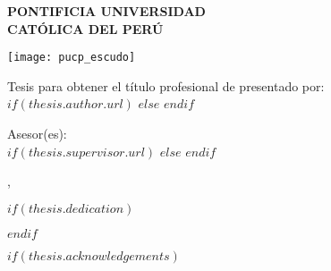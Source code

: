 \pagestyle{empty} %

\begin{titlepage}
\begin{center}

{\MakeUppercase{\textbf{PONTIFICIA UNIVERSIDAD \\ CATÓLICA DEL PERÚ}}\par}\vspace{0.25cm} %
\MakeUppercase{\textbf{\facname}}\vspace{0.5cm} %

\texttt{[image: pucp\_escudo]}\vspace{0.5cm}

{\ttitle\par}\vspace{0.4cm} %

{Tesis para obtener el título profesional de \degreename}{ presentado por:}\\[0.3cm] %

$if(thesis.author.url)$
\href{$thesis.author.url$}{\authorname} %
$else$
\authorname
$endif$

{Asesor(es):}\\[0.4cm]
$if(thesis.supervisor.url)$%
\href{$thesis.supervisor.url$}{\supname} %
$else$%
\supname
$endif$

{\cityname}{, }{\dateyearname}

\vfill
\end{center}
\end{titlepage}

$if(thesis.dedication)$

\dedicatory{} 
\newpage

$endif$

$if(thesis.acknowledgements)$

